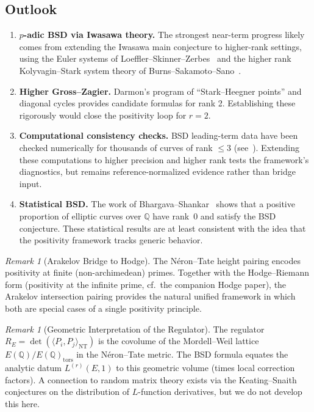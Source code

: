 \documentclass[aps,prd,twocolumn,superscriptaddress,nofootinbib,floatfix]{revtex4-2}
\theoremstyle{definition}
\theoremstyle{remark}
\newtheorem{remark}[theorem]{Remark}
\begin{document}
\subsection{Outlook}

\begin{enumerate}
\item \textbf{$p$-adic BSD via Iwasawa theory.} The strongest near-term progress likely comes from extending the Iwasawa main conjecture to higher-rank settings, using the Euler systems of Loeffler--Skinner--Zerbes~\cite{LSZ2020} and the higher rank Kolyvagin--Stark system theory of Burns--Sakamoto--Sano~\cite{BurnsSano2021,BurnsSakamotoSano2025}.

\item \textbf{Higher Gross--Zagier.} Darmon's program of ``Stark--Heegner points'' and diagonal cycles provides candidate formulas for rank 2. Establishing these rigorously would close the positivity loop for $r = 2$.

\item \textbf{Computational consistency checks.} BSD leading-term data have been checked numerically for thousands of curves of rank $\leq 3$ (see~\cite{LMFDB}). Extending these computations to higher precision and higher rank tests the framework's diagnostics, but remains reference-normalized evidence rather than bridge input.

\item \textbf{Statistical BSD.} The work of Bhargava--Shankar~\cite{BhargavaShankar2015} shows that a positive proportion of elliptic curves over $\mathbb{Q}$ have rank~0 and satisfy the BSD conjecture. These statistical results are at least consistent with the idea that the positivity framework tracks generic behavior.
\end{enumerate}


\begin{remark}[Arakelov Bridge to Hodge]
\label{rem:arakelov-bridge}
The Néron--Tate height pairing encodes positivity at finite (non-archimedean) primes. Together with the Hodge--Riemann form (positivity at the infinite prime, cf.\ the companion Hodge paper), the Arakelov intersection pairing provides the natural unified framework in which both are special cases of a single positivity principle.
\end{remark}


\begin{remark}[Geometric Interpretation of the Regulator]
\label{rem:entropic-capacity}
The regulator $R_E = \det(\langle P_i, P_j \rangle_{\mathrm{NT}})$ is the covolume of the Mordell--Weil lattice $E(\mathbb{Q})/E(\mathbb{Q})_{\mathrm{tors}}$ in the Néron--Tate metric. The BSD formula equates the analytic datum $L^{(r)}(E,1)$ to this geometric volume (times local correction factors). A connection to random matrix theory exists via the Keating--Snaith conjectures on the distribution of $L$-function derivatives, but we do not develop this here.
\end{remark}
\end{document}

